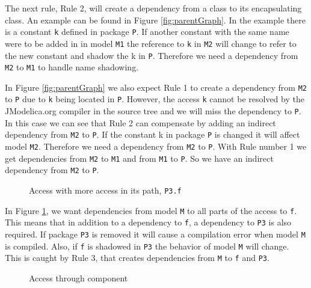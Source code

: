 \documentclass{cslthse-msc}
\begin{document}
The next rule, Rule 2, will create a dependency from a class to its encapsulating class. An example can be found in Figure \ref{fig:parentGraph}. In the example there is a constant \texttt{k} defined in package \texttt{P}. If another constant with the same name were to be added in in model \texttt{M1} the reference to \texttt{k} in \texttt{M2} will change to refer to the new constant and shadow the k in \texttt{P}. Therefore we need a dependency from \texttt{M2} to \texttt{M1} to handle name shadowing.

In Figure \ref{fig:parentGraph} we also expect Rule 1 to create a dependency from \texttt{M2} to \texttt{P} due to \texttt{k} being located in \texttt{P}. However, the access \texttt{k} cannot be resolved by the JModelica.org compiler in the source tree and we will miss the dependency to \texttt{P}. In this case we can see that Rule 2 can compensate by adding an indirect dependency from \texttt{M2} to \texttt{P}. 
If the constant k in package \texttt{P} is changed it will affect model \texttt{M2}. Therefore we need a dependency from \texttt{M2} to \texttt{P}. With Rule number 1 we get dependencies from \texttt{M2} to \texttt{M1} and from \texttt{M1} to \texttt{P}. So we have an indirect dependency from \texttt{M2} to \texttt{P}.

\begin{figure}[!htbp]
    \centering
    \qquad
    \caption{Access with more access in its path, \texttt{P3.f}}
    \label{fig:dotAccess}
\end{figure}

In Figure \ref{fig:dotAccess}, we want dependencies from model \texttt{M} to all parts of the access to \texttt{f}. This means that in addition to a dependency to \texttt{f}, a dependency to \texttt{P3} is also required. If package \texttt{P3} is removed it will cause a compilation error when model \texttt{M} is compiled. Also, if \texttt{f} is shadowed in \texttt{P3} the behavior of model \texttt{M} will change. This is caught by Rule 3, that creates dependencies from \texttt{M} to \texttt{f} and \texttt{P3}.


\begin{figure}[!htbp]
    \centering
    \qquad
    \subfloat{\raisebox{4.7 cm}{}}
    \caption{Access through component}
    \label{fig:component}
\end{figure}
\end{document}
